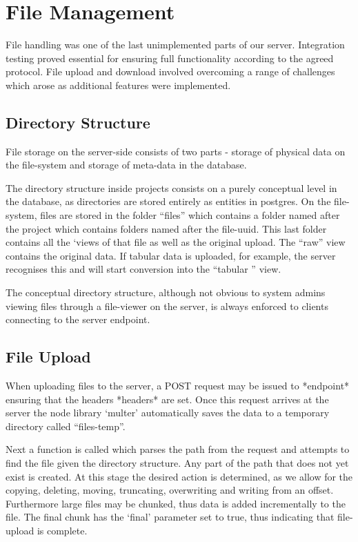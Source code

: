 \section{File Management}
File handling was one of the last unimplemented parts of our server. Integration testing proved essential for ensuring full functionality according to the agreed protocol. File upload and download involved overcoming a range of challenges which arose as additional features were implemented. 
\subsection{Directory Structure}
File storage on the server-side consists of two parts - storage of physical data on the file-system and storage of meta-data in the database. 

The directory structure inside projects consists on a purely conceptual level in the database, as directories are stored entirely as entities in postgres. On the file-system, files are stored in the folder ``files'' which contains a folder named after the project which contains folders named after the file-uuid. This last folder contains all the `views of that file as well as the original upload. The ``raw'' view contains the original data. If tabular data is uploaded, for example, the server recognises this and will start conversion into the ``tabular '' view.

The conceptual directory structure, although not obvious to system admins viewing files through a file-viewer on the server, is always enforced to clients connecting to the server endpoint. 

\subsection{File Upload}
When uploading files to the server, a POST request may be issued to *endpoint* ensuring that the headers *headers* are set. Once this request arrives at the server the node library `multer' automatically saves the data to a temporary directory called ``files-temp''. 

Next a function is called which parses the path from the request and attempts to find the file given the directory structure. Any part of the path that does not yet exist is created. At this stage the desired action is determined, as we allow for the copying, deleting, moving, truncating, overwriting and writing from an offset. Furthermore large files may be chunked, thus data is added incrementally to the file. The final chunk has the `final' parameter set to true, thus indicating that file-upload is complete.

